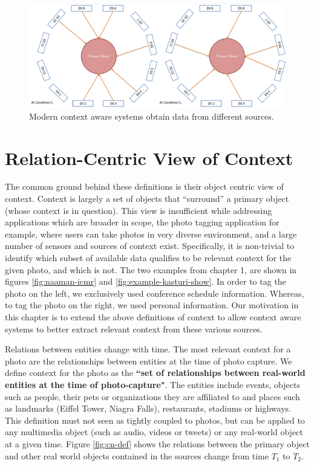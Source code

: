 \begin{figure}[t]
\centering
\includegraphics[width=\textwidth]{media/chapter2/va.png}
\caption{Modern context aware systems obtain data from different sources.}
\label{fig:va-def}
\end{figure}

\section{Relation-Centric View of Context}

The common ground behind these definitions is their object centric view of context. Context is largely a set of objects that ``surround'' a primary object (whose context is in question). This view is insufficient while addressing applications which are broader in scope, the photo tagging application for example, where users can take photos in very diverse environment, and a large number of sensors and sources of context exist. Specifically, it is non-trivial to identify which subset of available data qualifies to be relevant context for the given photo, and which is not. The two examples from chapter 1, are shown in figures \ref{fig:naaman-icmr} and \ref{fig:example-kasturi-show}. In order to tag the photo on the left, we exclusively used conference schedule information. Whereas, to tag the photo on the right, we used personal information. Our motivation in this chapter is to extend the above definitions of context to allow context aware systems to better extract relevant context from these various sources.

Relations between entities change with time. The most relevant context for a photo are the relationships between entities at the time of photo capture. We define context for the photo as the \textbf{``set of relationships between real-world entities at the time of photo-capture"}. The entities include events, objects such as people, their pets or organizations they are affiliated to and places such as landmarks (Eiffel Tower, Niagra Falls), restaurants, stadiums or highways. This definition must not seen as tightly coupled to photos, but can be applied to any multimedia object (such as audio, videos or tweets) or any real-world object at a given time. Figure \ref{fig:cn-def} shows the relations between the primary object and other real world objects contained in the sources change from time $T_1$ to $T_2$.

